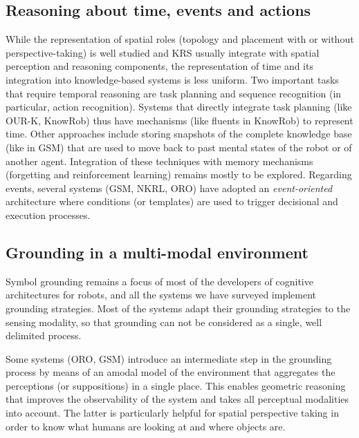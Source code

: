 \documentclass[journal]{IEEEtran}
\begin{document}
\subsection{Reasoning about time, events and actions}

While the representation of spatial roles (topology and placement with or without
perspective-taking) is well studied and KRS usually integrate with spatial
perception and reasoning components, the representation of time and its 
integration into knowledge-based systems is less uniform.
Two important tasks that require temporal reasoning are task planning and 
sequence recognition (in particular, action recognition). Systems that directly
integrate task planning (like OUR-K, {\sc KnowRob}) thus have mechanisms (like
fluents in {\sc KnowRob}) to represent time.
Other approaches include storing snapshots of the complete knowledge base 
(like in GSM) that are used to move back to past mental states of the robot 
or of another agent. Integration of these techniques with memory mechanisms 
(forgetting and reinforcement learning) remains mostly to be explored.
Regarding events, several systems (GSM, NKRL, ORO) have adopted an {\em
event-oriented} architecture where conditions (or templates) are used to
trigger decisional and execution processes.


\subsection{Grounding in a multi-modal environment}

Symbol grounding remains a focus of most of the developers of cognitive
architectures for robots, and all the systems we have surveyed implement
grounding strategies. Most of the systems
adapt their grounding strategies to the sensing modality, so that grounding can
not be considered as a single, well delimited process.

Some systems (ORO, GSM) introduce an intermediate step in the grounding process
by means of an amodal model of the environment that aggregates the perceptions 
(or suppositions) in a single place. This enables geometric reasoning that 
improves the observability of the system and takes all perceptual modalities 
into account. The latter is particularly helpful for spatial perspective taking 
in order to know what humans are looking at and where objects are.
\end{document}
